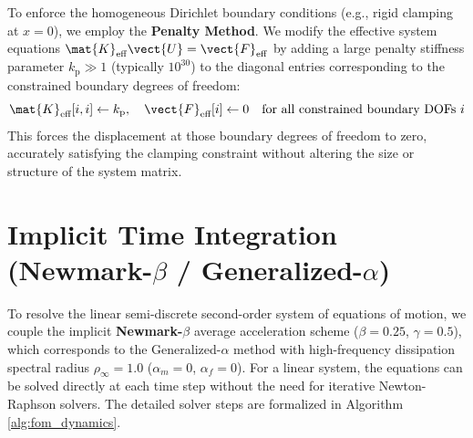 To enforce the homogeneous Dirichlet boundary conditions (e.g., rigid clamping at $x=0$), we employ the \textbf{Penalty Method}. We modify the effective system equations $\mat{K}_{\text{eff}}\vect{U} = \vect{F}_{\text{eff}}$ by adding a large penalty stiffness parameter $k_{\text{p}} \gg 1$ (typically $10^{30}$) to the diagonal entries corresponding to the constrained boundary degrees of freedom:
\begin{equation}
    \mat{K}_{\text{eff}}[i, i] \gets k_{\text{p}}, \quad \vect{F}_{\text{eff}}[i] \gets 0 \quad \text{for all constrained boundary DOFs } i
\end{equation}
This forces the displacement at those boundary degrees of freedom to zero, accurately satisfying the clamping constraint without altering the size or structure of the system matrix.

\section{Implicit Time Integration (\texorpdfstring{Newmark-$\beta$}{Newmark-beta} / Generalized-\texorpdfstring{$\alpha$}{alpha})}
To resolve the linear semi-discrete second-order system of equations of motion, we couple the implicit \textbf{Newmark-$\beta$} average acceleration scheme ($\beta=0.25$, $\gamma=0.5$), which corresponds to the Generalized-$\alpha$ method with high-frequency dissipation spectral radius $\rho_{\infty} = 1.0$ ($\alpha_m = 0$, $\alpha_f = 0$). For a linear system, the equations can be solved directly at each time step without the need for iterative Newton-Raphson solvers. The detailed solver steps are formalized in Algorithm \ref{alg:fom_dynamics}.

